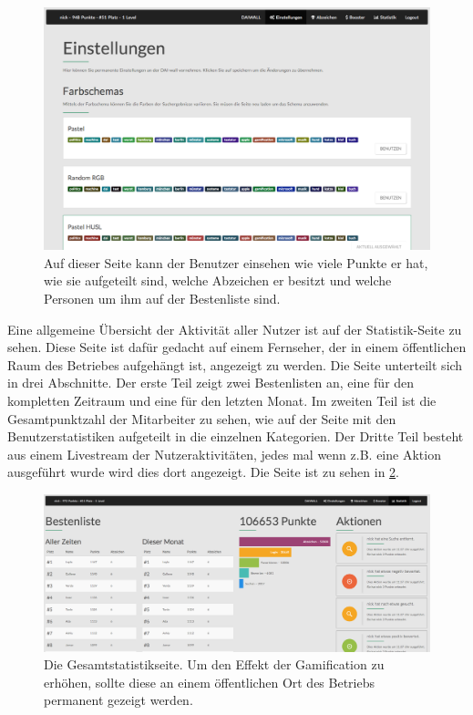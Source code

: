 \documentclass[12pt,twoside]{book}
\begin{document}
\begin{figure}[h]
    \centering
    \includegraphics[width=1.0\textwidth]{images/infoboard_settings.png}
    \caption{Auf dieser Seite kann der Benutzer einsehen wie viele Punkte er hat, wie sie aufgeteilt sind, welche Abzeichen er besitzt und welche Personen um ihm auf der Bestenliste sind.}
    \label{fig:settings}
\end{figure}

Eine allgemeine Übersicht der Aktivität aller Nutzer ist auf der Statistik-Seite zu sehen. Diese Seite ist dafür gedacht auf einem Fernseher, der in einem öffentlichen Raum des Betriebes aufgehängt ist, angezeigt zu werden. Die Seite unterteilt sich in drei Abschnitte. Der erste Teil zeigt zwei Bestenlisten an, eine für den kompletten Zeitraum und eine für den letzten Monat. Im zweiten Teil ist die Gesamtpunktzahl der Mitarbeiter zu sehen, wie auf der Seite mit den Benutzerstatistiken aufgeteilt in die einzelnen Kategorien. Der Dritte Teil besteht aus einem Livestream der Nutzeraktivitäten, jedes mal wenn z.B. eine Aktion ausgeführt wurde wird dies dort angezeigt. Die Seite ist zu sehen in \ref{fig:stats}.


\begin{figure}[h]
    \centering
    \includegraphics[width=1.0\textwidth]{images/infoboard_stats.png}
    \caption{Die Gesamtstatistikseite. Um den Effekt der Gamification zu erhöhen, sollte diese an einem öffentlichen Ort des Betriebs permanent gezeigt werden.}
    \label{fig:stats}
\end{figure}
\end{document}
